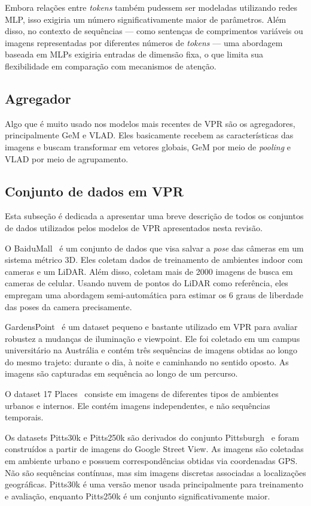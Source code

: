 \documentclass[letterpaper, 10 pt, conference]{ieeeconf}  %
\begin{document}
Embora relações entre \textit{tokens} também pudessem ser modeladas utilizando redes MLP, isso exigiria um número significativamente maior de parâmetros. Além disso, no contexto de sequências — como sentenças de comprimentos variáveis ou imagens representadas por diferentes números de \textit{tokens} — uma abordagem baseada em MLPs exigiria entradas de dimensão fixa, o que limita sua flexibilidade em comparação com mecanismos de atenção.




\subsection{Agregador}
Algo que é muito usado nos modelos mais recentes de VPR são os agregadores, principalmente GeM e VLAD. Eles basicamente recebem as características das imagens e buscam transformar em vetores globais, GeM por meio de \textit{pooling} e VLAD por meio de agrupamento.



\subsection{Conjunto de dados em VPR}
Esta subseção é dedicada a apresentar uma breve descrição de todos os conjuntos de dados utilizados pelos modelos de VPR apresentados nesta revisão.


O BaiduMall~\cite{baidu} é um conjunto de dados que visa salvar a \textit{pose} das câmeras em um sistema métrico 3D. Eles coletam dados de treinamento de ambientes indoor com cameras e um LiDAR. Além disso, coletam mais de 2000 imagens de busca em cameras de celular. Usando nuvem de pontos do LiDAR como referência, eles empregam uma abordagem semi-automática para estimar os 6 graus de liberdade das poses da camera precisamente.


GardensPoint~\cite{garden} é um dataset pequeno e bastante utilizado em VPR para avaliar robustez a mudanças de iluminação e viewpoint. Ele foi coletado em um campus universitário na Austrália e contém três sequências de imagens obtidas ao longo do mesmo trajeto: durante o dia, à noite e caminhando no sentido oposto. As imagens são capturadas em sequência ao longo de um percurso.

O dataset 17 Places~\cite{places} consiste em imagens de diferentes tipos de ambientes urbanos e internos. Ele contém imagens independentes, e não sequências temporais.

Os datasets Pitts30k e Pitts250k são derivados do conjunto Pittsburgh~\cite{pitts} e foram construídos a partir de imagens do Google Street View. As imagens são coletadas em ambiente urbano e possuem correspondências obtidas via coordenadas GPS. Não são sequências contínuas, mas sim imagens discretas associadas a localizações geográficas. Pitts30k é uma versão menor usada principalmente para treinamento e avaliação, enquanto Pitts250k é um conjunto significativamente maior.
\end{document}
